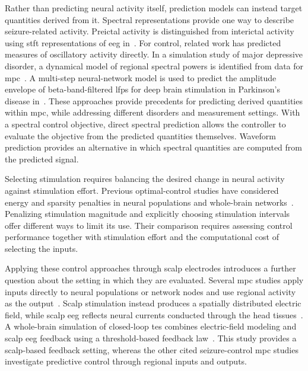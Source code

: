 Rather than predicting neural activity itself, prediction models can instead target quantities derived from it.
Spectral representations provide one way to describe seizure-related activity. Preictal activity is distinguished from interictal activity using \ac{stft} representations of \ac{eeg} in~\cite{Truong2018}.
For control, related work has predicted measures of oscillatory activity directly.
In a simulation study of major depressive disorder, a dynamical model of regional spectral powers is identified from data for \ac{mpc}~\cite{Fang2023}.
A multi-step neural-network model is used to predict the amplitude envelope of beta-band-filtered \acp{lfp} for deep brain stimulation in Parkinson's disease in~\cite{Steffen2025}.
These approaches provide precedents for predicting derived quantities within \ac{mpc}, while addressing different disorders and measurement settings.
With a spectral control objective, direct spectral prediction allows the controller to evaluate the objective from the predicted quantities themselves.
Waveform prediction provides an alternative in which spectral quantities are computed from the predicted signal.

Selecting stimulation requires balancing the desired change in neural activity against stimulation effort.
Previous optimal-control studies have considered energy and sparsity penalties in neural populations and whole-brain networks~\cite{Chouzouris2021,Salfenmoser2022,Salfenmoser2023}.
Penalizing stimulation magnitude and explicitly choosing stimulation intervals offer different ways to limit its use.
Their comparison requires assessing control performance together with stimulation effort and the computational cost of selecting the inputs.

Applying these control approaches through scalp electrodes introduces a further question about the setting in which they are evaluated.
Several \ac{mpc} studies apply inputs directly to neural populations or network nodes and use regional activity as the output~\cite{Chang2020,Fang2023,Liang2024}.
Scalp stimulation instead produces a spatially distributed electric field, while scalp \ac{eeg} reflects neural currents conducted through the head tissues~\cite{Huang2019,Buzsaki2012}.
A whole-brain simulation of closed-loop \ac{tes} combines electric-field modeling and scalp \ac{eeg} feedback using a threshold-based feedback law~\cite{Yu2024}.
This study provides a scalp-based feedback setting, whereas the other cited seizure-control \ac{mpc} studies investigate predictive control through regional inputs and outputs.


